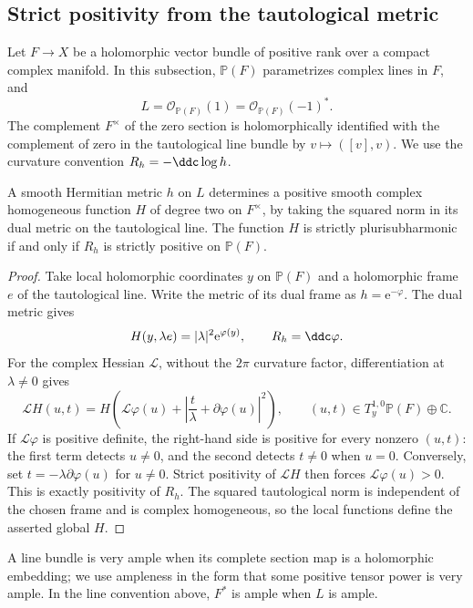 \subsection{Strict positivity from the tautological metric}
\label{subsec:tautological-homogeneous-positivity}

Let $F\to X$ be a holomorphic vector bundle of positive rank over a compact complex manifold. In this subsection, $\mathbb P(F)$ parametrizes complex lines in $F$, and
\[
 L=\mathcal O_{\mathbb P(F)}(1)
   =\mathcal O_{\mathbb P(F)}(-1)^*.
\]
The complement $F^\times$ of the zero section is holomorphically identified with the complement of zero in the tautological line bundle by $v\mapsto([v],v)$. We use the curvature convention $R_h=-\ddc\log h$.

\begin{lemma}\label{lem:tautological-homogeneous-levi}
A smooth Hermitian metric $h$ on $L$ determines a positive smooth complex homogeneous function $H$ of degree two on $F^\times$, by taking the squared norm in its dual metric on the tautological line. The function $H$ is strictly plurisubharmonic if and only if $R_h$ is strictly positive on $\mathbb P(F)$.
\end{lemma}
\begin{proof}
Take local holomorphic coordinates $y$ on $\mathbb P(F)$ and a holomorphic frame $e$ of the tautological line. Write the metric of its dual frame as $h=\mathrm e^{-\varphi}$. The dual metric gives
\[
 H(y,\lambda e)=|\lambda|^2\mathrm e^{\varphi(y)},\qquad
 R_h=\ddc\varphi.
\]
For the complex Hessian $\mathcal L$, without the $2\pi$ curvature factor, differentiation at $\lambda\ne0$ gives
\[
 \mathcal L H(u,t)
 =H\left(\mathcal L\varphi(u)+
          \left|\frac{t}{\lambda}+\partial\varphi(u)\right|^2\right),
 \qquad (u,t)\in T_y^{1,0}\mathbb P(F)\oplus\mathbb C.
\]
If $\mathcal L\varphi$ is positive definite, the right-hand side is positive for every nonzero $(u,t)$: the first term detects $u\ne0$, and the second detects $t\ne0$ when $u=0$. Conversely, set $t=-\lambda\partial\varphi(u)$ for $u\ne0$. Strict positivity of $\mathcal L H$ then forces $\mathcal L\varphi(u)>0$. This is exactly positivity of $R_h$. The squared tautological norm is independent of the chosen frame and is complex homogeneous, so the local functions define the asserted global $H$.
\end{proof}

A line bundle is very ample when its complete section map is a holomorphic embedding; we use ampleness in the form that some positive tensor power is very ample. In the line convention above, $F^*$ is ample when $L$ is ample.

